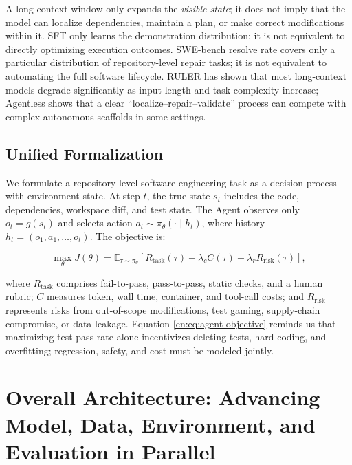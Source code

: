 \documentclass[10pt,a4paper,UTF8,fontset=none]{ctexart}
\begin{document}
\begin{keybox}
A long context window only expands the \emph{visible state}; it does not imply that the model can localize dependencies, maintain a plan, or make correct modifications within it. SFT only learns the demonstration distribution; it is not equivalent to directly optimizing execution outcomes. SWE-bench resolve rate covers only a particular distribution of repository-level repair tasks; it is not equivalent to automating the full software lifecycle. RULER has shown that most long-context models degrade significantly as input length and task complexity increase\cite{en:hsieh2024ruler}; Agentless shows that a clear ``localize--repair--validate'' process can compete with complex autonomous scaffolds in some settings\cite{en:xia2024agentless}.
\end{keybox}

\subsection{Unified Formalization}

We formulate a repository-level software-engineering task as a decision process with environment state. At step $t$, the true state $s_t$ includes the code, dependencies, workspace diff, and test state. The Agent observes only $o_t=g(s_t)$ and selects action $a_t\sim\pi_\theta(\cdot\mid h_t)$, where history $h_t=(o_1,a_1,\ldots,o_t)$. The objective is:

\begin{equation}
\max_\theta J(\theta)=\mathbb{E}_{\tau\sim\pi_\theta}\left[R_{\mathrm{task}}(\tau)-\lambda_c C(\tau)-\lambda_r R_{\mathrm{risk}}(\tau)\right],
\label{en:eq:agent-objective}
\end{equation}

where $R_{\mathrm{task}}$ comprises fail-to-pass, pass-to-pass, static checks, and a human rubric; $C$ measures token, wall time, container, and tool-call costs; and $R_{\mathrm{risk}}$ represents risks from out-of-scope modifications, test gaming, supply-chain compromise, or data leakage. Equation \eqref{en:eq:agent-objective} reminds us that maximizing test pass rate alone incentivizes deleting tests, hard-coding, and overfitting; regression, safety, and cost must be modeled jointly.

\section{Overall Architecture: Advancing Model, Data, Environment, and Evaluation in Parallel}
\end{document}
